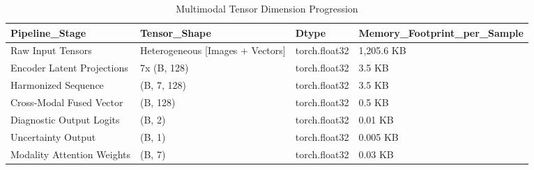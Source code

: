 \begin{table}
\caption{Multimodal Tensor Dimension Progression}
\begin{tabular}{llll}
\toprule
Pipeline_Stage & Tensor_Shape & Dtype & Memory_Footprint_per_Sample \\
\midrule
Raw Input Tensors & Heterogeneous [Images + Vectors] & torch.float32 & 1,205.6 KB \\
Encoder Latent Projections & 7x (B, 128) & torch.float32 & 3.5 KB \\
Harmonized Sequence & (B, 7, 128) & torch.float32 & 3.5 KB \\
Cross-Modal Fused Vector & (B, 128) & torch.float32 & 0.5 KB \\
Diagnostic Output Logits & (B, 2) & torch.float32 & 0.01 KB \\
Uncertainty Output & (B, 1) & torch.float32 & 0.005 KB \\
Modality Attention Weights & (B, 7) & torch.float32 & 0.03 KB \\
\bottomrule
\end{tabular}
\end{table}
